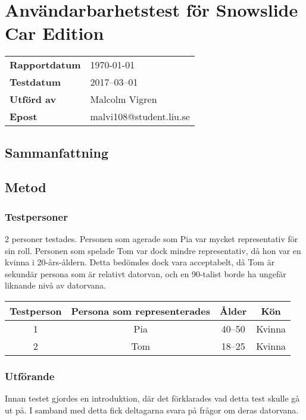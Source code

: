 \documentclass[a4paper,12pt,titlepage]{article}
\begin{document}
\section*{Användarbarhetstest för Snowslide Car Edition}

\renewcommand*{\arraystretch}{1.4}
\begin{longtable}[l]{p{4cm} l}
    \textbf{Rapportdatum}    & \today \\
    \textbf{Testdatum   }    & 2017--03--01 \\
    \textbf{Utförd av   }    & Malcolm Vigren \\
    \textbf{Epost       }    & malvi108@student.liu.se \\
\end{longtable}

\subsection*{Sammanfattning}
\subsection*{Metod}
\subsubsection*{Testpersoner}

2 personer testades. Personen som agerade som Pia var mycket representativ för
sin roll. Personen som spelade Tom var dock mindre representativ, då hon var en
kvinna i 20-års-åldern. Detta bedömdes dock vara acceptabelt, då Tom är
sekundär persona som är relativt datorvan, och en 90-talist borde ha ungefär
liknande nivå av datorvana.

\begin{longtable}[l]{c c c c}
    \textbf{Testperson} & \textbf{Persona som representerades} & \textbf{Ålder} & \textbf{Kön} \\ \midrule
    1 & Pia & 40--50 & Kvinna \\ \midrule
    2 & Tom & 18--25 & Kvinna \\ \midrule
\end{longtable}

\subsubsection*{Utförande}

Innan testet gjordes en introduktion, där det förklarades vad detta test skulle
gå ut på. I samband med detta fick deltagarna svara på frågor om deras
datorvana.
\end{document}
